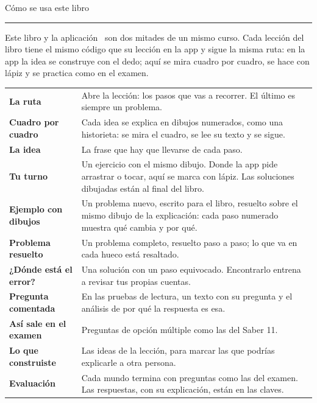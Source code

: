 \cleardoublepage
\thispagestyle{vacia}
{\sffamily\fontsize{26}{30}\selectfont\firalight Cómo se usa este libro\par}\vspace{2pt}
{\color{zlime}\rule{18mm}{1.6pt}}\par\vspace{8pt}

Este libro y la aplicación \marca\ son dos mitades de un mismo curso. Cada lección del libro tiene el mismo código que su
lección en la app y sigue la misma ruta: en la app la idea se construye con el dedo; aquí se mira cuadro por cuadro, se
hace con lápiz y se practica como en el examen.

\vspace{4pt}
\begin{tabularx}{\linewidth}{@{}>{\leavevmode\sffamily\small\bfseries\color{zolive}}p{34mm}X@{}}
La ruta & Abre la lección: los pasos que vas a recorrer. El último es siempre un problema.\\[4pt]
Cuadro por cuadro & Cada idea se explica en dibujos numerados, como una historieta: se mira el cuadro, se lee su texto y se
sigue.\\[4pt]
La idea & La frase que hay que llevarse de cada paso.\\[4pt]
Tu turno & Un ejercicio con el mismo dibujo. Donde la app pide arrastrar o tocar, aquí se marca con lápiz. Las soluciones
dibujadas están al final del libro.\\[4pt]
Ejemplo con dibujos & Un problema nuevo, escrito para el libro, resuelto sobre el mismo dibujo de la explicación: cada paso
numerado muestra qué cambia y por qué.\\[4pt]
Problema resuelto & Un problema completo, resuelto paso a paso; lo que va en cada hueco está resaltado.\\[4pt]
¿Dónde está el error? & Una solución con un paso equivocado. Encontrarlo entrena a revisar tus propias cuentas.\\[4pt]
Pregunta comentada & En las pruebas de lectura, un texto con su pregunta y el análisis de por qué la respuesta es esa.\\[4pt]
Así sale en el examen & Preguntas de opción múltiple como las del Saber 11.\\[4pt]
Lo que construiste & Las ideas de la lección, para marcar las que podrías explicarle a otra persona.\\[4pt]
Evaluación & Cada mundo termina con preguntas como las del examen. Las respuestas, con su explicación, están en las claves.\\
\end{tabularx}

